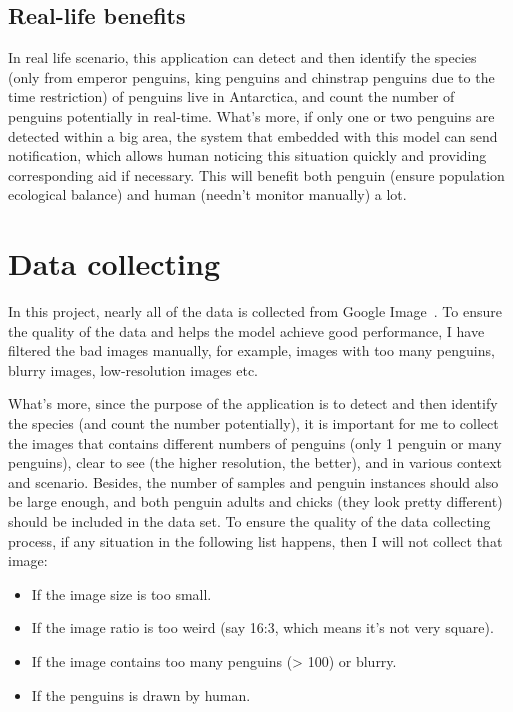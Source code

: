 \documentclass[runningheads]{llncs}
\begin{document}
\subsection{Real-life benefits}
In real life scenario, this application can detect and then identify the species (only from emperor penguins, king penguins and chinstrap penguins due to the time restriction) of penguins live in Antarctica, and count the number of penguins potentially in real-time. What's more, if only one or two penguins are detected within a big area, the system that embedded with this model can send notification, which allows human noticing this situation quickly and providing corresponding aid if necessary. This will benefit both penguin (ensure population ecological balance) and human (needn't monitor manually) a lot.


\section{Data collecting}
In this project, nearly all of the data is collected from Google Image~\cite{ref_google_image}. To ensure the quality of the data and helps the model achieve good performance, I have filtered the bad images manually, for example, images with too many penguins, blurry images, low-resolution images etc.

What's more, since the purpose of the application is to detect and then identify the species (and count the number potentially), it is important for me to collect the images that contains different numbers of penguins (only 1 penguin or many penguins), clear to see (the higher resolution, the better), and in various context and scenario. Besides, the number of samples and penguin instances should also be large enough, and both penguin adults and chicks (they look pretty different) should be included in the data set. To ensure the quality of the data collecting process, if any situation in the following list happens, then I will not collect that image:

\begin{itemize}
  \item If the image size is too small.
  \item If the image ratio is too weird (say 16:3, which means it's not very square).
  \item If the image contains too many penguins (> 100) or blurry.
  \item If the penguins is drawn by human.
\end{itemize}
\end{document}
